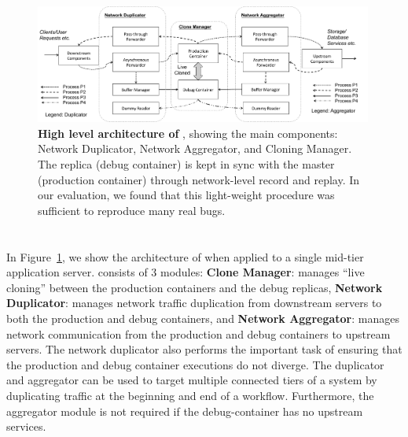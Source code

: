 
\begin{figure}[t]
	\begin{centering}
		\includegraphics[width=0.99\textwidth]{parikshan/figs/arch_full.pdf}
		\caption{\textbf{High level architecture of \parikshan}, showing the main components: Network Duplicator, Network Aggregator, and Cloning Manager. The replica (debug container) is kept in sync with the master (production container) through network-level record and replay. In our evaluation, we found that this light-weight procedure was sufficient to reproduce many real bugs.}
		\label{fig:network_arch}
	\end{centering}
\end{figure}



\section{\parikshan}
\label{sec:parikshanDesign}

In Figure~\ref{fig:network_arch}, we show the architecture of \parikshan when applied to a single mid-tier application server.
\parikshan consists of 3 modules: 
\textbf{Clone Manager}: manages ``live cloning'' between the production containers and the debug replicas, 
\textbf{Network Duplicator}: manages network traffic duplication from downstream servers to both the production and debug containers, 
and \textbf{Network Aggregator}: manages network communication from the production and debug containers to upstream servers.
The network duplicator also performs the important task of ensuring that the production and debug container executions do not diverge.
The duplicator and aggregator can be used to target multiple connected tiers of a system by duplicating traffic at the beginning and end of a workflow.
Furthermore, the aggregator module is not required if the debug-container has no upstream services. 



